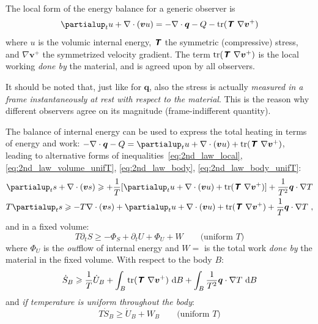 \documentclass[\ifafour a4paper,12pt,\else a5paper,10pt,\fi%
onecolumn,oneside,article,%
british%
]{memoir}
\theoremstyle{remark}
\theoremstyle{innote}
\newcommand*{\mathte}[1]{\textbf{\textit{\textsf{#1}}}}
\newcommand*{\de}{\partialup}%
\newcommand*{\di}{\mathrm{d}}%
\DeclareMathOperator{\tr}{tr}%
\renewcommand*{\ge}{\geqslant}%
\renewcommand*{\|}[1][]{\nonscript\,#1\vert\nonscript\;\mathopen{}}
\newcommand*{\yv}{\bm{v}}
\newcommand*{\yq}{\bm{q}}
\newcommand*{\yT}{\mathte{T}}
\begin{document}
\bigskip

The local form of the energy balance for a generic observer is
\begin{equation}
  \label{eq:energy_bal_local}
  \begin{gathered}
    \de_{t}u + \nabla\cdot(\yv u) =
  -\nabla\cdot\yq  - Q - \tr(\yT\ \nabla\yv^{+})
\end{gathered}
\end{equation}
where $u$ is the volumic internal energy, $\yT$ the symmetric (compressive)
stress, and $\nabla\yv^{+}$ the symmetrized velocity gradient. The term
$\tr(\yT\ \nabla\yv^{+})$ is the local working \emph{done by} the material, and is
agreed upon by all observers.

It should be noted that, just like for $\yq$, also the stress is actually
\emph{measured in a frame instantaneously at rest with respect to the
  material}. This is the reason why different observers agree on its
magnitude (frame-indifferent quantity).

The balance of internal energy can be used to express the total heating in terms of
energy and work: $-\nabla\cdot\yq  - Q = \de_{t}u + \nabla\cdot(\yv u) +
\tr(\yT\ \nabla\yv^{+})$, leading to alternative forms of
inequalities~\eqref{eq:2nd_law_local}, \eqref{eq:2nd_law_volume_unifT},
\eqref{eq:2nd_law_body}, \eqref{eq:2nd_law_body_unifT}:
\begin{equation}
  \label{eq:2nd_law_local_energy}
  \begin{gathered}
  \de_{t}s + \nabla\cdot(\yv s) \ge
  +\frac{1}{T}[\de_{t}u + \nabla\cdot(\yv u) +
\tr(\yT\ \nabla\yv^{+})] +\frac{1}{T^{2}}\yq\cdot\nabla T
  \\
  T\de_{t}s \ge - T\nabla\cdot(\yv s) 
  +\de_{t}u + \nabla\cdot(\yv u) +
\tr(\yT\ \nabla\yv^{+}) +\frac{1}{T}\yq\cdot\nabla T \ ,
\end{gathered}
\end{equation}
and in a fixed volume:
\begin{equation}
  \label{eq:2nd_law_volume_unifT_energy}
  T\de_{t}S \ge -\varPhi_{S} + \de_{t}U + \varPhi_{U} + W \qquad\text{(uniform $T$)}
\end{equation}
where $\varPhi_{U}$ is the \emph{out}flow of internal energy and $W = $ is the
total work \emph{done by} the material in the fixed volume. With respect to
the body $B$:
\begin{equation}
  \label{eq:2nd_law_body_energy}
  \Dot{S}_{B} \ge \frac{1}{T}\Dot{U}_{B}
  +\int_{B}\tr(\yT\ \nabla\yv^{+})\ \di B
  + \int_{B} \frac{1}{T^{2}}\yq\cdot\nabla T \ \di B
\end{equation}
and \emph{if temperature is uniform throughout the body}:
\begin{equation}
  \label{eq:2nd_law_body_unifT_energy}
  T\Dot{S}_{B} \ge  \Dot{U}_{B} + W_{B} \qquad\text{(uniform $T$)}
\end{equation}
\end{document}
